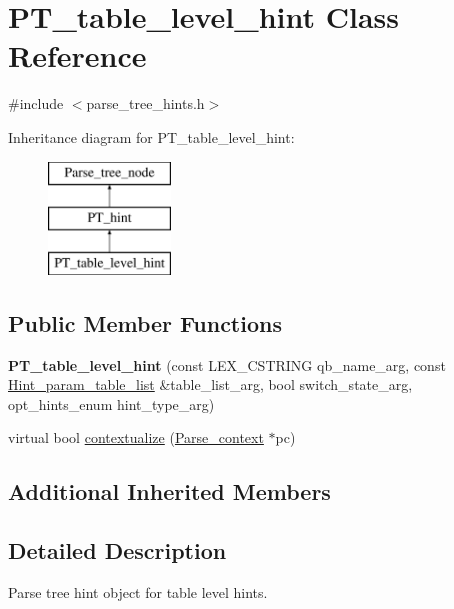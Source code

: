\hypertarget{classPT__table__level__hint}{}\section{P\+T\+\_\+table\+\_\+level\+\_\+hint Class Reference}
\label{classPT__table__level__hint}


{\ttfamily \#include $<$parse\+\_\+tree\+\_\+hints.\+h$>$}

Inheritance diagram for P\+T\+\_\+table\+\_\+level\+\_\+hint\+:\begin{figure}[H]
\begin{center}
\leavevmode
\includegraphics[height=3.000000cm]{classPT__table__level__hint}
\end{center}
\end{figure}
\subsection*{Public Member Functions}
\begin{DoxyCompactItemize}
\item 
\mbox{\label{classPT__table__level__hint_a19ba4566203b614faea5e87f5e1f760c}} 
{\bfseries P\+T\+\_\+table\+\_\+level\+\_\+hint} (const L\+E\+X\+\_\+\+C\+S\+T\+R\+I\+NG qb\+\_\+name\+\_\+arg, const \mbox{\hyperlink{classMem__root__array__YY}{Hint\+\_\+param\+\_\+table\+\_\+list}} \&table\+\_\+list\+\_\+arg, bool switch\+\_\+state\+\_\+arg, opt\+\_\+hints\+\_\+enum hint\+\_\+type\+\_\+arg)
\item 
virtual bool \mbox{\hyperlink{classPT__table__level__hint_ab7601fb1f9159525f67e3dcf14c36e9a}{contextualize}} (\mbox{\hyperlink{structParse__context}{Parse\+\_\+context}} $\ast$pc)
\end{DoxyCompactItemize}
\subsection*{Additional Inherited Members}


\subsection{Detailed Description}
Parse tree hint object for table level hints. 

